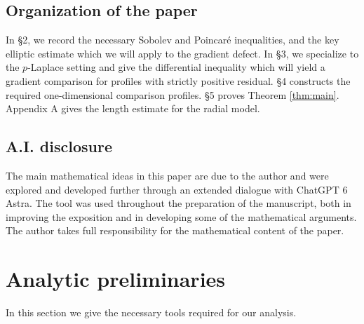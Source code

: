 \documentclass[11pt]{amsart}
\theoremstyle{definition}
\newtheorem{lemma}[theorem]{Lemma}
\begin{document}


\subsection*{Organization of the paper}
In \S 2, we record the necessary Sobolev and Poincar\'e inequalities, and the key elliptic estimate which we will apply to the gradient defect. In \S 3, we specialize to the $p$-Laplace setting and give the differential inequality which will yield a gradient comparison for profiles with strictly positive residual. \S 4 constructs the required one-dimensional comparison profiles. \S 5 proves Theorem \ref{thm:main}. Appendix A gives the length estimate for the radial model.
\subsection*{A.I. disclosure}
 The main mathematical ideas in this paper are due to the author and
were explored and developed further through an extended dialogue with ChatGPT 6 Astra.
The tool was used throughout the preparation of the manuscript, both in improving the
exposition and in developing some of the mathematical arguments. The author takes full
responsibility for the mathematical content of the paper.


\section{Analytic preliminaries}
In this section we give the necessary tools required for our analysis.   

\end{document}
